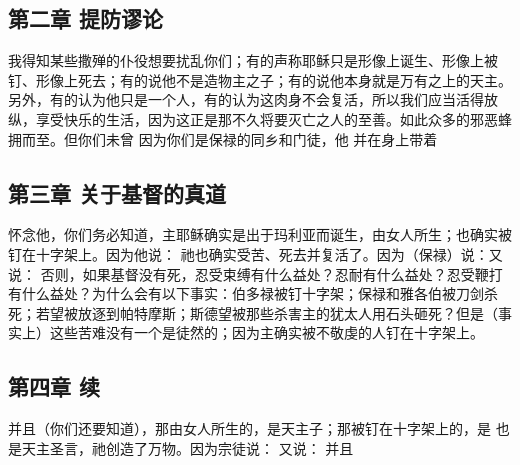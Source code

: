 \subsection{第二章 提防谬论}

我得知某些撒殚的仆役想要扰乱你们；有的声称耶稣只是形像上诞生、形像上被钉、形像上死去；有的说他不是造物主之子；有的说他本身就是万有之上的天主。另外，有的认为他只是一个人，有的认为这肉身不会复活，所以我们应当活得放纵，享受快乐的生活，因为这正是那不久将要灭亡之人的至善。如此众多的邪恶蜂拥而至。但你们未曾 因为你们是保禄的同乡和门徒，他 并在身上带着\par


\subsection{第三章 关于基督的真道}

怀念他，你们务必知道，主耶稣确实是出于玛利亚而诞生，由女人所生；也确实被钉在十字架上。因为他说： 祂也确实受苦、死去并复活了。因为（保禄）说：又说： 否则，如果基督没有死，忍受束缚有什么益处？忍耐有什么益处？忍受鞭打有什么益处？为什么会有以下事实：伯多禄被钉十字架；保禄和雅各伯被刀剑杀死；若望被放逐到帕特摩斯；斯德望被那些杀害主的犹太人用石头砸死？但是（事实上）这些苦难没有一个是徒然的；因为主确实被不敬虔的人钉在十字架上。\par


\subsection{第四章 续}

并且（你们还要知道），那由女人所生的，是天主子；那被钉在十字架上的，是 也是天主圣言，祂创造了万物。因为宗徒说： 又说： 并且\par


